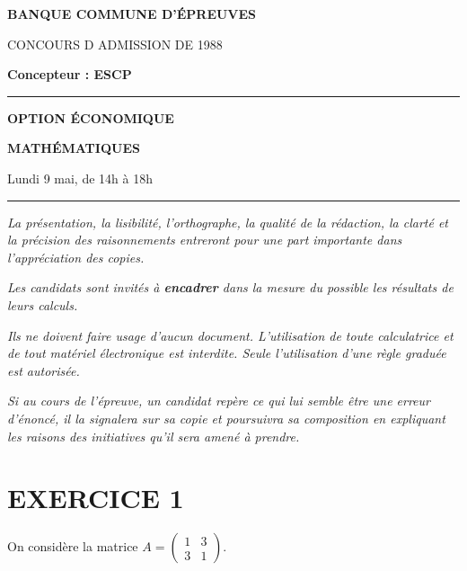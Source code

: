 \documentclass[11pt]{article}%
\begin{document}

\begin{center}
{\LARG\E\textbf{BANQUE COMMUNE D'ÉPREUVES}}



{\large \textsc{CONCOURS D ADMISSION DE 1988}}



{\large \textbf{Concepteur : ESCP}}



\rule{2.39cm}{0.05cm}



{\Large \textbf{OPTION ÉCONOMIQUE}}



{\Large \textbf{MATHÉMATIQUES }}



{\Large Lundi 9 mai, de 14h à 18h}



\rule{2.39cm}{0.05cm}
\end{center}

\textit{La présentation, la lisibilité, l'orthographe, la qualité
de la rédaction, la clarté et la précision des raisonnements
entreront pour une part importante dans l'appréciation des copies.}

\textit{Les candidats sont invités à \textbf{encadrer} dans la mesure
du possible les résultats de leurs calculs.}

\textit{Ils ne doivent faire usage d'aucun document. L'utilisation de
toute
calculatrice et de tout matériel électronique est interdite. Seule
l'utilisation d'une règle graduée est autorisée.}

\textit{Si au cours de l'épreuve, un candidat repère ce qui lui semble
être une erreur d'énoncé, il la signalera sur sa copie et
poursuivra sa composition en expliquant les raisons des initiatives
qu'il sera
amené à prendre.}

\vspace*{3cm}

\section*{EXERCICE 1 }

On considère la matrice $A = \left( 
\begin{array}{cc}
1 & 3 \\
3 & 1
\end{array}
\right) $.
\end{document}
